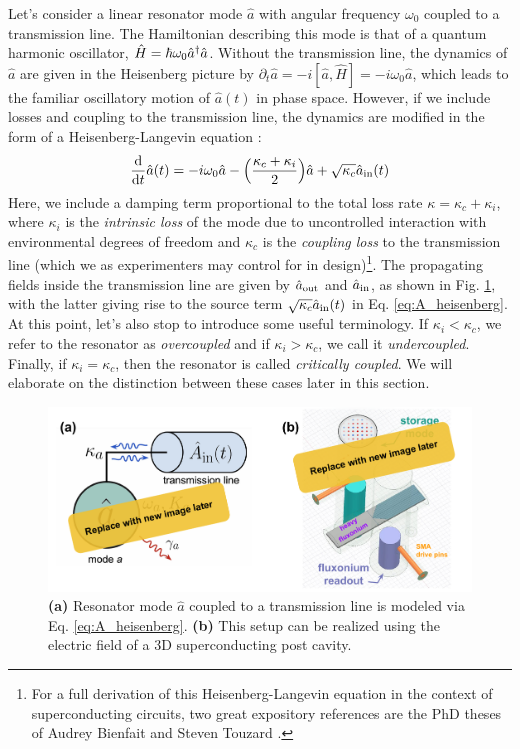Let's consider a linear resonator mode $\hat{a}$ with angular frequency $\omega_0$ coupled to a transmission line. The Hamiltonian describing this mode is that of a quantum harmonic oscillator, $\hat{H} = \hbar\omega_0 \hat{a}^\dagger \hat{a}$. Without the transmission line, the dynamics of $\hat{a}$ are given in the Heisenberg picture by $\partial_t\hat{a} = -i[\hat{a}, \hat{H}] = -i\omega_0\hat{a}$, which leads to the familiar oscillatory motion of $\hat{a}(t)$ in phase space. However, if we include losses and coupling to the transmission line, the dynamics are modified in the form of a Heisenberg-Langevin equation \cite{walls1994quantum, gardiner2004quantum, clerk2010introduction}:
\begin{equation}
    \odv*{\hat{a}}{t}(t) = -i\omega_0\hat{a} - \Big(\frac{\kappa_c + \kappa_i}{2}\Big)\hat{a} + \sqrt{\kappa_c}\hat{a}_{\rm in}(t)
    \label{eq:A_heisenberg}
\end{equation}
Here, we include a damping term proportional to the total loss rate $\kappa = \kappa_c + \kappa_i$, where $\kappa_i$ is the \textit{intrinsic loss} of the mode due to uncontrolled interaction with environmental degrees of freedom and $\kappa_c$ is the \textit{coupling loss} to the transmission line (which we as experimenters may control for in design)\footnote{For a full derivation of this Heisenberg-Langevin equation in the context of superconducting circuits, two great expository references are the PhD theses of Audrey Bienfait \cite{bienfait2016thesis} and Steven Touzard \cite{touzard2019thesis}.}. The propagating fields inside  the transmission line are given by $\hat{a}_{\rm out}$ and $\hat{a}_{\rm in}$, as shown in Fig. \ref{fig:A_InputOutput}, with the latter giving rise to the source term $\sqrt{\kappa_c}\hat{a}_{\rm in}(t)$ in Eq. \eqref{eq:A_heisenberg}. At this point, let's also stop to introduce some useful terminology. If $\kappa_i < \kappa_c$, we refer to the resonator as \textit{overcoupled} and if $\kappa_i > \kappa_c$, we call it \textit{undercoupled}. Finally, if $\kappa_i = \kappa_c$, then the resonator is called \textit{critically coupled}. We will elaborate on the distinction between these cases later in this section. 


\begin{figure}[h]
    \centering
    \includegraphics[width=0.8\linewidth]{Figures/A/InputOutput.pdf}
    \caption{\textbf{(a)} Resonator mode $\hat{a}$ coupled to a transmission line is modeled via Eq. \eqref{eq:A_heisenberg}. \textbf{(b)} This setup can be realized using the electric field of a 3D superconducting post cavity.}
    \label{fig:A_InputOutput}
\end{figure}

